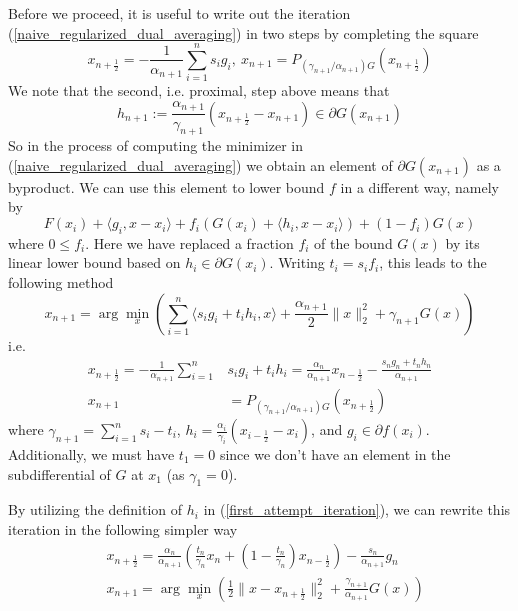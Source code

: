 Before we proceed, it is useful to write out the iteration (\ref{naive_regularized_dual_averaging}) in two steps by completing the
square
\begin{equation}
 x_{n+\frac{1}{2}} = -\frac{1}{\alpha_{n+1}}\displaystyle\sum_{i = 1}^n s_ig_i,~x_{n+1} = P_{(\gamma_{n+1}/\alpha_{n+1})G}(x_{n+\frac{1}{2}})
\end{equation}
We note that the second, i.e. proximal, step above means that
$$h_{n+1}:=\frac{\alpha_{n+1}}{\gamma_{n+1}}(x_{n+\frac{1}{2}} - x_{n+1})\in \partial G(x_{n+1})
$$
So in the process of computing the minimizer in (\ref{naive_regularized_dual_averaging}) we obtain an element
of $\partial G(x_{n+1})$ as a byproduct. We can use this element to lower bound $f$ in a different way, namely by
$$ F(x_i) + \langle g_i, x - x_i\rangle + f_i(G(x_i) + \langle h_i, x - x_i\rangle) + (1 - f_i)G(x)
$$
where $0 \leq f_i$. Here we have replaced a fraction $f_i$ of the bound $G(x)$ by its linear lower bound
based on $h_i\in \partial G(x_i)$. Writing $t_i = s_if_i$, this leads to the following method
\begin{equation}\label{argmin_formulation_generalized_RDA}
 x_{n+1} = \arg\min_x \left(\displaystyle\sum_{i = 1}^n \langle s_ig_i + t_ih_i, x\rangle + \frac{\alpha_{n+1}}{2}\|x\|_2^2 + \gamma_{n+1} G(x)\right)
\end{equation}
i.e.
\begin{align}\label{first_attempt_iteration}
 x_{n+\frac{1}{2}} = -\frac{1}{\alpha_{n+1}}\displaystyle\sum_{i = 1}^n &s_ig_i + t_ih_i = \frac{\alpha_n}{\alpha_{n+1}}x_{n-\frac{1}{2}} - \frac{s_ng_n + t_nh_n}{\alpha_{n+1}}\\
 x_{n+1} &= P_{(\gamma_{n+1}/\alpha_{n+1})G}(x_{n+\frac{1}{2}})
\end{align}
where $\gamma_{n + 1} = \sum_{i = 1}^n s_i-t_i$, $h_i = \frac{\alpha_{i}}{\gamma_{i}}(x_{i-\frac{1}{2}} - x_{i})$, and
$g_i\in \partial f(x_i)$. Additionally, we must have $t_1 = 0$ since we don't have an element in the subdifferential
of $G$ at $x_1$ (as $\gamma_1 = 0$).

By utilizing the definition of $h_i$ in (\ref{first_attempt_iteration}), we can rewrite this iteration in the following simpler way
\begin{align}\label{generalized_RDA_iteration}
 &x_{n+\frac{1}{2}} = \frac{\alpha_n}{\alpha_{n+1}}\left(\frac{t_n}{\gamma_n}x_n + \left(1 - \frac{t_n}{\gamma_n}\right)x_{n-\frac{1}{2}}\right) - \frac{s_n}{\alpha_{n+1}}g_n \\
 &x_{n+1} = \arg\min_x \left(\frac{1}{2}\|x - x_{n+\frac{1}{2}}\|_2^2 + \frac{\gamma_{n+1}}{\alpha_{n+1}}G(x)\right)
\end{align}

